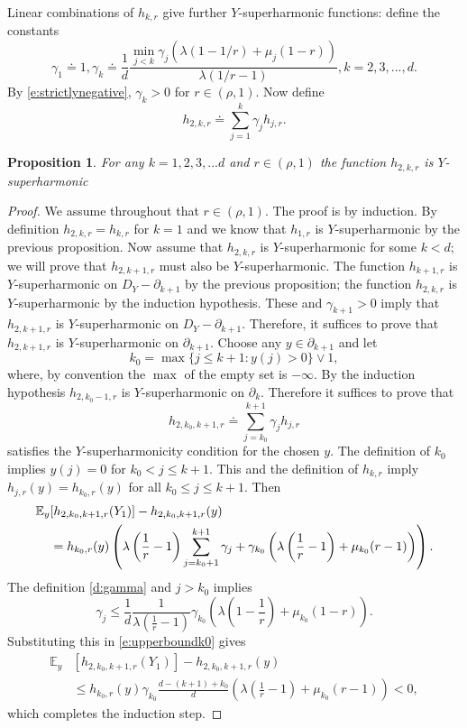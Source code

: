 \documentclass[11pt,a4paper]{article}
\newtheorem{proposition}{Proposition}[section]
\begin{document}
Linear combinations of $h_{k,r}$ give
further $Y$-superharmonic functions:
define the constants
\begin{equation}\label{d:gamma}
\gamma_1 \doteq 1, 
\gamma_k \doteq \frac{1}{d}\frac{\min_{j < k}\gamma_j(\lambda(1 -1/r) + \mu_{j}(1-r))}{\lambda(1/r - 1) }, k=2,3,...,d.
\end{equation}
By \eqref{e:strictlynegative}, $\gamma_k > 0$ for  $r \in (\rho,1)$.
Now define
\[
h_{2,k,r} \doteq \sum_{j=1}^k \gamma_j h_{j,r}.
\]
\begin{proposition}\label{p:Ysuperharmonicfuns}
For any $k=1,2,3,...d$ and $r \in (\rho,1)$
the function $h_{2,k,r}$ is $Y$-superharmonic
\end{proposition}
\begin{proof}
We assume throughout that $r \in (\rho,1).$
The proof is by induction. By definition $h_{2,k,r} = h_{k,r}$ for $k=1$
and we know that $h_{1,r}$ is $Y$-superharmonic by the previous proposition.
Now assume that $h_{2,k,r}$ is $Y$-superharmonic for some $k< d$; we will prove
that $h_{2,k+1,r}$ must also be $Y$-superharmonic. The function
$h_{k+1,r}$ is $Y$-superharmonic on $D_Y - \partial_{k+1}$ by the
previous proposition; the function $h_{2,k,r}$ is $Y$-superharmonic
by the induction hypothesis. These
and  $\gamma_{k+1} > 0$ imply that $h_{2,k+1,r}$ is $Y$-superharmonic
on $D_Y - \partial_{k+1}.$ Therefore, it suffices to prove that
$h_{2,k+1,r}$ is $Y$-superharmonic on $\partial_{k+1}.$
Choose any $y\in \partial_{k+1}$ and let
\[
k_0 = \max\{j \le k+1: y(j) > 0 \} \vee 1,
\]
where, by convention the $\max$ of the empty set is $-\infty.$
By the induction hypothesis $h_{2,k_0-1,r}$ is $Y$-superharmonic on
$\partial_k$.
Therefore it suffices to prove that
\[
h_{2,k_0,k+1,r} \doteq \sum_{j=k_0}^{k+1} \gamma_j h_{j,r}
\]
satisfies the $Y$-superharmonicity condition for the chosen $y$.
The definition of $k_0$ implies $y(j) = 0$ for $k_0 < j \le k+1.$
This and the definition of $h_{k,r}$ imply
$h_{j,r}(y) = h_{k_0,r}(y)$ for all $k_0 \le j \le k+1$.
Then
\begin{align}
{\mathbb E}_y&[h_{2,k_0,k+1,r}(Y_1)] -h_{2,k_0,k+1,r}(y) \notag\\
&=
h_{k_0,r}(y) \left( \lambda \left(\frac{1}{r}-1\right) \sum_{j=k_0+1}^{k+1} \gamma_j
+ \gamma_{k_0} \left( \lambda\left(\frac{1}{r}-1\right) + \mu_{k_0}(r-1)\right)
\right).\label{e:upperboundk0}
\end{align}
The definition \eqref{d:gamma} and $j > k_0$ implies
\[
\gamma_j \le \frac{1}{d} 
\frac{1}{\lambda\left(\frac{1}{r}-1\right) }
\gamma_{k_0} \left( \lambda\left(1-\frac{1}{r}\right) +\mu_{k_0}(1-r)\right).
\]
Substituting this in \eqref{e:upperboundk0} gives
\begin{align*}
{\mathbb E}_y&[h_{2,k_0,k+1,r}(Y_1)] -h_{2,k_0,k+1,r}(y) \\
&\le
h_{k_0,r}(y) 
\gamma_{k_0}\frac{d-(k+1)+k_0}{d} 
\left( \lambda\left(\frac{1}{r}-1\right) +  \mu_{k_0}(r-1)\right) 
 < 0,
\end{align*}
which completes the induction step.
\end{proof}
\end{document}
